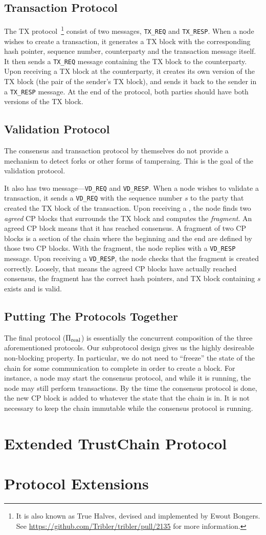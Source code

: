 \subsection{Transaction Protocol}
The TX protocol~\footnote{It is also known as True Halves, devised and implemented by Ewout Bongers.
See \url{https://github.com/Tribler/tribler/pull/2135} for more information.}
consist of two messages, \texttt{TX\_REQ} and \texttt{TX\_RESP}.
When a node  wishes to create a transaction,
it generates a TX block with the corresponding hash pointer, sequence number, counterparty and the transaction message itself.
It then sends a \texttt{TX\_REQ} message containing the TX block to the counterparty.
Upon receiving a TX block at the counterparty, it creates its own version of the TX block (the pair of the sender's TX block),
and sends it back to the sender in a \texttt{TX\_RESP} message.
At the end of the protocol, both parties should have both versions of the TX block.

\subsection{Validation Protocol}
The consensus and transaction protocol by themselves do not provide a mechanism to detect forks or other forms of tamperaing.
This is the goal of the validation protocol.

It also has two message---\texttt{VD\_REQ} and \texttt{VD\_RESP}.
When a node wishes to validate a transaction,
it sends a \texttt{VD\_REQ} with the sequence number $s$ to the party that created the TX block of the transaction.
Upon receiving a , the node finds two \emph{agreed} CP blocks that surrounds the TX block and computes the \emph{fragment}.
An agreed CP block means that it has reached consensus.
A fragment of two CP blocks is a section of the chain where the beginning and the end are defined by those two CP blocks.
With the fragment, the node replies with a \texttt{VD\_RESP} message.
Upon receiving a \texttt{VD\_RESP}, the node checks that the fragment is created correctly.
Loosely, that means the agreed CP blocks have actually reached consensus,
the fragment has the correct hash pointers,
and TX block containing $s$ exists and is valid.


\subsection{Putting The Protocols Together}
The final protocol ($\Pi_{\text{real}}$) is essentially the concurrent composition of the three aforementioned protocols.
Our subprotocol design gives us the highly desireable non-blocking property.
In particular, we do not need to ``freeze'' the state of the chain for some communication to complete in order to create a block.
For instance, a node may start the consensus protocol, and while it is running, the node may still perform transactions.
By the time the consensus protocol is done, the new CP block is added to whatever the state that the chain is in.
It is not necessary to keep the chain immutable while the consensus protocol is running.


\section{Extended TrustChain Protocol}

\section{Protocol Extensions}

